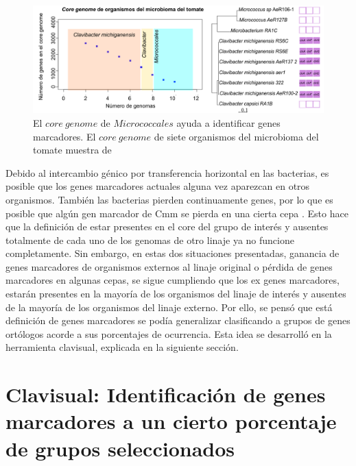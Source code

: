 \documentclass[12pt,twoside]{reedthesis}
\begin{document}
  \begin{figure}[h!tbp]
  \centering
  \includegraphics[angle = 0,scale = .7]{chapter1/CoreGenomeMicrobioma.pdf}
  \caption[El $core~genome$ de $Micrococcales$ ayuda a identificar genes marcadores ]{\footnotesize{El $core~genome$ de $Micrococcales$ ayuda a identificar genes marcadores. El $core~genome$ de siete organismos del microbioma del tomate muestra  de }}
  \label{fig:Clavibacter-EvoMining}
  \end{figure}
  
  Debido al intercambio génico por transferencia horizontal en las
  bacterias, es posible que los genes marcadores actuales alguna vez
  aparezcan en otros organismos. También las bacterias pierden
  continuamente genes, por lo que es posible que algún gen marcador de Cmm
  se pierda en una cierta cepa . Esto hace que la definición de estar
  presentes en el core del grupo de interés y ausentes totalmente de cada
  uno de los genomas de otro linaje ya no funcione completamente. Sin
  embargo, en estas dos situaciones presentadas, ganancia de genes
  marcadores de organismos externos al linaje original o pérdida de genes
  marcadores en algunas cepas, se sigue cumpliendo que los ex genes
  marcadores, estarán presentes en la mayoría de los organismos del linaje
  de interés y ausentes de la mayoría de los organismos del linaje
  externo. Por ello, se pensó que está definición de genes marcadores se
  podía generalizar clasificando a grupos de genes ortólogos acorde a sus
  porcentajes de ocurrencia. Esta idea se desarrolló en la herramienta
  clavisual, explicada en la siguiente sección.
  
  \section{Clavisual: Identificación de genes marcadores a un cierto
  porcentaje de grupos
  seleccionados}\label{clavisual-identificacion-de-genes-marcadores-a-un-cierto-porcentaje-de-grupos-seleccionados}
  
\end{document}
